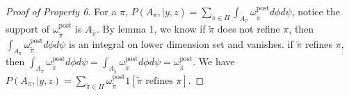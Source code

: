 \documentclass[aoas,preprint]{imsart}
\begin{document}
\begin{proof}[Proof of Property 6]
For a $\pi$, $P(A_\pi, | y, z) = \underset{\tilde \pi \in \Pi}{\sum} \int_{A_{\pi}} \omega_{\tilde \pi}^{\text{post}} d\phi d\psi$, notice the support of $\omega_{\tilde \pi}^{\text{post}}$ is $A_{\tilde \pi}$. 
By lemma 1, we know if $\tilde \pi$ does not refine $\pi$, then $\int_{A_{\pi}} \omega_{\tilde \pi}^{\text{post}} d\phi d\psi$ is an integral on lower dimension set and vanishes. if $\tilde \pi$ refines $\pi$, then 
$\int_{A_{\pi}} \omega_{\tilde \pi}^{\text{post}} d\phi d\psi = \int_{A_{\tilde \pi}} \omega_{\tilde \pi}^{\text{post}} d\phi d\psi = \omega_{\tilde \pi}^{\text{post}}$. We have $P(A_\pi, | y, z) = \underset{\tilde \pi \in \Pi}{\sum} \omega_{\tilde \pi}^{\text{post}} 1[\tilde \pi \text{ refines } \pi ]$.
\end{proof}
\end{document}
